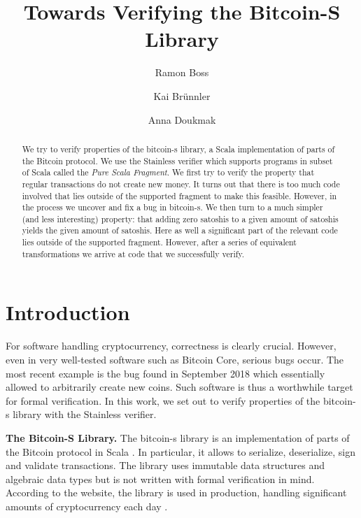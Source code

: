 \documentclass[runningheads]{llncs}
\renewcommand{\paragraph}{\textbf}%
\begin{document}
\title{Towards Verifying the Bitcoin-S Library}

\author{Ramon Boss \and Kai Brünnler \and Anna Doukmak}


\maketitle             

\begin{abstract}
  We try to verify properties of the bitcoin-s library, a Scala
  implementation of parts of the Bitcoin protocol. We use the
  Stainless verifier which supports programs in subset of Scala called
  the \emph{Pure Scala Fragment}. We first try to verify the property
  that regular transactions do not create new money. It turns out that
  there is too much code involved that lies outside of the supported
  fragment to make this feasible. However, in the process we uncover
  and fix a bug in bitcoin-s. We then turn to a much simpler (and less
  interesting) property: that adding zero satoshis to a given amount
  of satoshis yields the given amount of satoshis. Here as well a
  significant part of the relevant code lies outside of the supported
  fragment. However, after a series of equivalent transformations we
  arrive at code that we successfully verify.

\end{abstract}



\section{Introduction}

For software handling cryptocurrency, correctness is clearly crucial.
However, even in very well-tested software such as Bitcoin Core,
serious bugs occur. The most recent example is the bug found in
September 2018 \cite{cve201817144} which essentially allowed to
arbitrarily create new coins. Such software is thus a worthwhile
target for formal verification. In this work, we set out to verify
properties of the bitcoin-s library with the Stainless verifier.

\paragraph{The Bitcoin-S Library.} The bitcoin-s library is an
implementation of parts of the Bitcoin protocol in Scala
\cite{BitcoinS:website,BitcoinS:github}. In particular, it allows to
serialize, deserialize, sign and validate transactions. The library
uses immutable data structures and algebraic data types but is not
written with formal verification in mind. According to the website,
the library is used in production, handling significant amounts of
cryptocurrency each day \cite{BitcoinS:website}.
\end{document}
